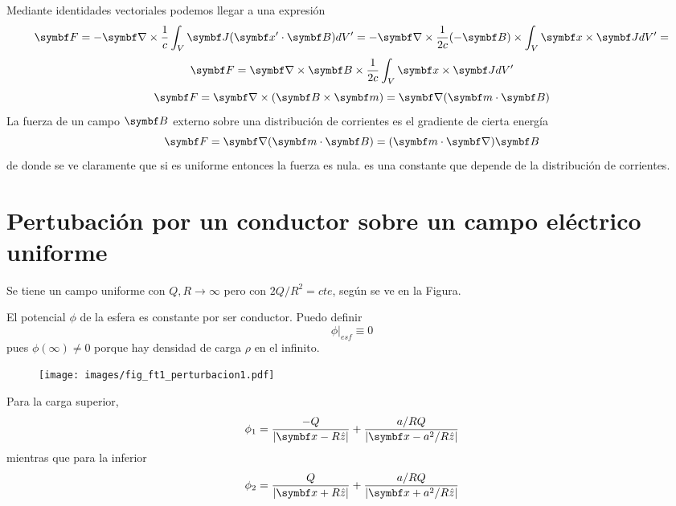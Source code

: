 \documentclass[10pt,oneside]{CBFT_book}
\begin{document}
Mediante identidades vectoriales podemos llegar a una expresión
\[
	\vb{F} = - \Nabla \times \frac{1}{c} \int_V \vb{J}(\vb{x}'\cdot\vb{B}) dV' =
	-\Nabla \times \frac{1}{2c} (-\vb{B}) \times \int_V \vb{x} \times \vb{J} dV' =
\]
\[
	\vb{F} = \Nabla \times \vb{B} \times \frac{1}{2c}\int_V \vb{x} \times \vb{J} dV'
\]
\[
	\vb{F} = \Nabla \times (\pv{B}{m}) = \Nabla(\pe{m}{B})
\]
La fuerza de un campo $\vb{B}$ externo sobre una distribución de corrientes es el gradiente de cierta
energía
\[
	\vb{F} = \Nabla(\vb{m}\cdot\vb{B}) = (\vb{m}\cdot\Nabla)\vb{B}
\]
de donde se ve claramente que si  es uniforme entonces la fuerza es nula.
 es una constante que depende de la distribución de corrientes.

\section{Pertubación por un conductor sobre un campo eléctrico uniforme}

Se tiene un campo uniforme con $Q,R \to \infty$ pero con $2Q/R^2 = cte$, según se ve en la Figura.


El potencial $\phi$ de la esfera es constante por ser conductor.
Puedo definir 
\[
	\phi|_{esf} \equiv 0
\]
pues $\phi(\infty)\neq 0 $ porque hay densidad de carga $\rho$ en el infinito.

\begin{figure}[htb]
	\begin{center}
	\texttt{[image: images/fig\_ft1\_perturbacion1.pdf]}	 
	\end{center}
	\caption{}
\end{figure}
Para la carga superior,
\[
	\phi_1 = \frac{-Q}{|\vb{x} - R\hat{z}|} + \frac{a/R Q}{|\vb{x} - a^2/R\hat{z}|}
\]
mientras que para la inferior
\[
	\phi_2 = \frac{Q}{|\vb{x} + R\hat{z}|} + \frac{ a/R Q}{|\vb{x} + a^2/R\hat{z}|}
\]
\end{document}
